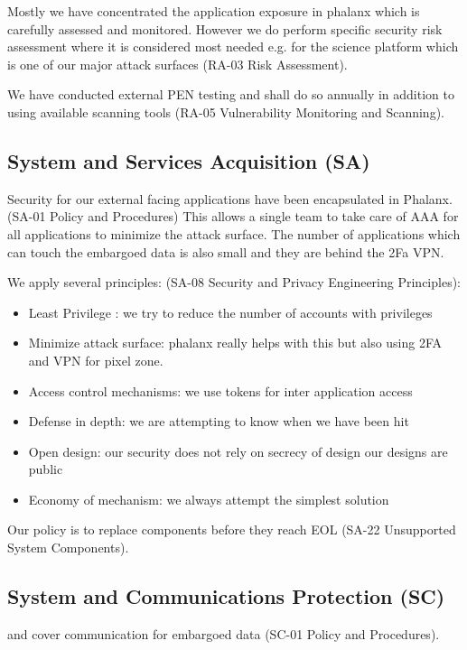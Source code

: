 Mostly we have concentrated the application exposure in phalanx which is carefully assessed and monitored.
However we do perform specific security risk assessment where it is considered most needed e.g.  for the science platform which is one of our major attack surfaces (RA-03  Risk Assessment).

We have conducted external PEN testing and shall do so annually in addition to using available scanning tools (RA-05  Vulnerability Monitoring and Scanning).

\subsection{System and Services Acquisition (SA)} \label{sec:SA}
Security for our external facing applications have been encapsulated in Phalanx. (SA-01  Policy and Procedures)
This allows a single team to take care of AAA for all applications  to minimize  the  attack surface.
The number of applications which can touch the embargoed data is also small and they are behind the 2Fa VPN.

We apply several  principles: (SA-08  Security and Privacy Engineering Principles):

\begin{itemize}
\item Least Privilege : we try to reduce the number of accounts with privileges
\item Minimize attack surface:  phalanx really helps with this but also using 2FA and VPN for pixel zone.
\item Access control mechanisms: we use tokens for inter application access
\item Defense in depth: we are attempting to know when we have been hit
\item Open design: our security does not rely on secrecy of design our designs are public
\item Economy of mechanism: we always attempt the simplest solution
\end{itemize}


Our policy is to replace components before they reach EOL (SA-22  Unsupported System Components).


\subsection{System and Communications Protection (SC)} \label{sec:SC}
 and  cover communication  for embargoed data (SC-01  Policy and Procedures).

